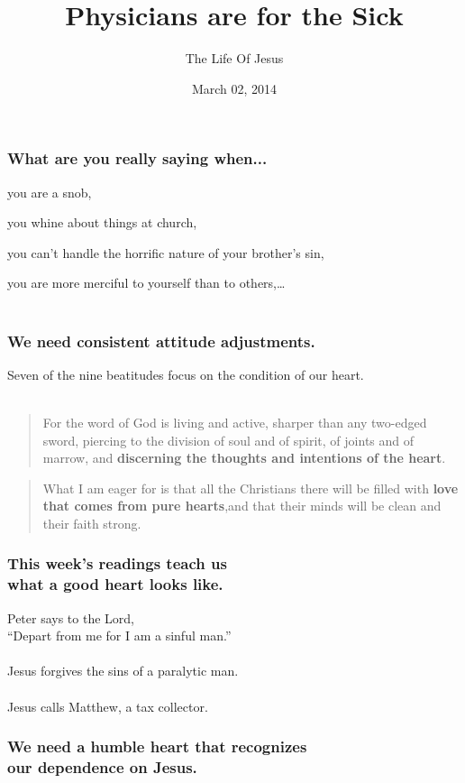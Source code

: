\documentclass{beamer}
\title{Physicians are for the Sick}
\subtitle{The Life Of Jesus}
\date{March 02, 2014}
\begin{document}
\frame{\titlepage}

\begin{frame}
\frametitle{What are you really saying when...}

you are a snob,

you whine about things at church,

you can't handle the horrific nature of your brother's sin,

you are more merciful to yourself than to others,\dots\\~\\

\centering{}

\end{frame}

\begin{frame}
\frametitle{We need consistent attitude adjustments.}
Seven of the nine beatitudes focus on the condition of our heart.\\~\\
\begin{quote}
For the word of God is living and active, sharper than any two-edged sword, piercing to the division of soul and of spirit, of joints and of marrow, and \textbf{discerning the thoughts and intentions of the heart}.

\end{quote}

\begin{quote}
What I am eager for is that all the Christians there will be filled with \textbf{love that comes from pure hearts},and that their minds will be clean and their faith strong.

\end{quote}
\end{frame}

\begin{frame}
\frametitle{This week's readings teach us\\what a good heart looks like.}
Peter says to the Lord,\\``Depart from me for I am a sinful man.''\\~\\
Jesus forgives the sins of a paralytic man.\\~\\
Jesus calls Matthew, a tax collector.
\end{frame}

\begin{frame}
\frametitle{We need a humble heart that recognizes\\our dependence on Jesus.}
\end{frame}
\end{document}
